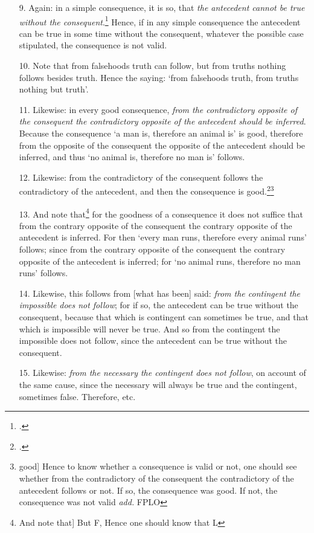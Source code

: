 \begin{itemize}
\item[9.] Again: in a simple consequence, it is so, that \textit{the antecedent cannot be true without the consequent}.\footnote{\cite[p. 61.30; p. 199.26]{BurleyDPAL}.} Hence, if in any simple consequence the antecedent can be true in some time without the consequent, whatever the possible case stipulated, the consequence is not valid.
\item[10.] Note that from falsehoods truth can follow, but from truths nothing follows besides truth. Hence the saying: `from falsehoods truth, from truths nothing but truth'.
\item[11.] Likewise: in every good consequence, \textit{from the contradictory opposite of the consequent the contradictory opposite of the antecedent should be inferred}. Because the consequence `a man is, therefore an animal is' is good, therefore from the opposite of the consequent the opposite of the antecedent should be inferred, and thus `no animal is, therefore no man is' follows.
\item[12.] Likewise: from the contradictory of the consequent follows the contradictory of the antecedent, and then the consequence is good.\footnote{\cite[p. 64.1; p. 207.3]{BurleyDPAL}.}\footnote{good] Hence to know whether a consequence is valid or not, one should see whether from the contradictory of the consequent the contradictory of the antecedent follows or not. If so, the consequence was good. If not, the consequence was not valid \textit{add.} FPLO}
\item[13.] And note that\footnote{And note that] But F, Hence one should know that L} for the goodness of a consequence it does not suffice that from the contrary opposite of the consequent the contrary opposite of the antecedent is inferred. For then `every man runs, therefore every animal runs' follows; since from the contrary opposite of the consequent the contrary opposite of the antecedent is inferred; for `no animal runs, therefore no man runs' follows.
\item[14.] Likewise, this follows from [what has been] said: \textit{from the contingent the impossible does not follow}; for if so, the antecedent can be true without the consequent, because that which is contingent can sometimes be true, and that which is impossible will never be true. And so from the contingent the impossible does not follow, since the antecedent can be true without the consequent.
\item[15.] Likewise: \textit{from the necessary the contingent does not follow}, on account of the same cause, since the necessary will always be true and the contingent, sometimes false. Therefore, etc. 

\end{itemize}

